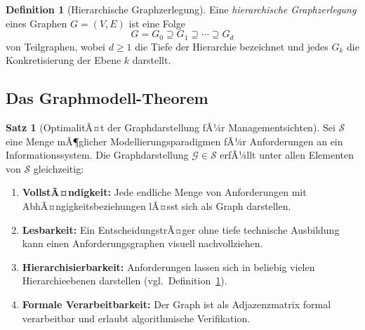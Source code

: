 ﻿\documentclass[a4paper,12pt]{article}
\theoremstyle{definition}
\newtheorem{definition}{Definition}
\newtheorem{satz}{Satz}
\begin{document}
\begin{definition}[Hierarchische Graphzerlegung]
\label{def:hierarchie}
Eine \emph{hierarchische Graphzerlegung} eines Graphen $G = (V, E)$ ist eine Folge
\[
  G = G_0 \supseteq G_1 \supseteq \cdots \supseteq G_d
\]
von Teilgraphen, wobei $d \geq 1$ die Tiefe der Hierarchie bezeichnet und jedes
$G_k$ die Konkretisierung der Ebene $k$ darstellt.
\end{definition}

\subsection{Das Graphmodell-Theorem}

\begin{satz}[OptimalitÃ¤t der Graphdarstellung fÃ¼r Managementsichten]
\label{satz:graphoptimal}
Sei $\mathcal{S}$ eine Menge mÃ¶glicher Modellierungsparadigmen fÃ¼r Anforderungen an ein
Informationssystem. Die Graphdarstellung
$\mathcal{G} \in \mathcal{S}$ erfÃ¼llt unter allen Elementen von $\mathcal{S}$ gleichzeitig:
\begin{enumerate}
  \item \textbf{VollstÃ¤ndigkeit:} Jede endliche Menge von Anforderungen mit
        AbhÃ¤ngigkeitsbeziehungen lÃ¤sst sich als Graph darstellen.
  \item \textbf{Lesbarkeit:} Ein EntscheidungstrÃ¤ger ohne tiefe technische Ausbildung kann
        einen Anforderungsgraphen visuell nachvollziehen.
  \item \textbf{Hierarchisierbarkeit:} Anforderungen lassen sich in beliebig vielen
        Hierarchieebenen darstellen (vgl.\ Definition~\ref{def:hierarchie}).
  \item \textbf{Formale Verarbeitbarkeit:} Der Graph ist als Adjazenzmatrix formal
        verarbeitbar und erlaubt algorithmische Verifikation.
\end{enumerate}
\end{satz}
\end{document}
